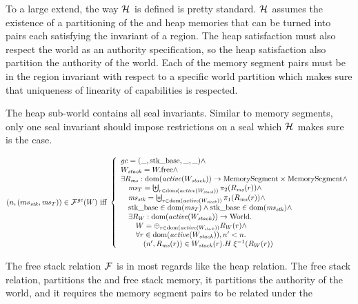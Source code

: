 \begin{jversion}
To a large extend, the way $\lrheap$ is defined is pretty standard.
$\lrheap$ assumes the existence of a partitioning of the \trgcm{} and \srccm{} heap memories that can be turned into pairs each satisfying the invariant of a region.
The heap satisfaction must also respect the world as an authority specification, so the heap satisfaction also partition the authority of the world.
Each of the memory segment pairs must be in the region invariant with respect to a specific world partition which makes sure that uniqueness of linearity of capabilities is respected.

The heap sub-world contains all seal invariants.
Similar to memory segments, only one seal invariant should impose restrictions on a seal which $\lrheap$ makes sure is the case.
\begin{definition}
\label{def:free-stack-rel}
\[
  \memSatFStack{ms_\stk,\ms_T}{W} \text{ iff } 
  \left\{
    \begin{array}{l}
      \gc = (\_,\stkb,\_,\_) \wedge\\
      W_\var{stack} = \pwfree \wedge \\
      \exists R_\ms : \dom(\activeReg{W_\var{stack}}) \fun \MemSeg \times \MemSeg \wedge \\
      \quad \ms_T = \biguplus_{r \in \dom(\activeReg{W_\var{stack}})} \pi_2(R_\ms(r)) \wedge \\
      \quad \ms_\stk = \biguplus_{r \in \dom(\activeReg{W_\var{stack}})} \pi_1(R_\ms(r)) \wedge \\
      \quad \stkb \in \dom(\ms_T) \wedge \stkb \in \dom(\ms_\stk) \wedge \\
      \quad \exists R_W : \dom(\activeReg{W_\var{stack}}) \fun \World\ldotp\\
      \qquad W = \oplus_{r \in \dom(\activeReg{W_\var{stack}})} R_W(r) \wedge\\
      \qquad \forall r \in \dom(\activeReg{W_\var{stack}}),n' < n \ldotp \\
      \qquad \quad \npair[n']{R_\ms(r)} \in  W_\var{stack}(r).H \; \xi^{-1}(R_W(r))
    \end{array}
  \right.
\]
\end{definition}
The free stack relation $\lrfree[]$ is in most regards like the heap relation.
The free stack relation, partitions the \srccm{} and \trgcm{} free stack memory, it partitions the authority of the world, and it requires the memory segment pairs to be related under the
\begin{definition}

\end{definition}
\end{jversion}
